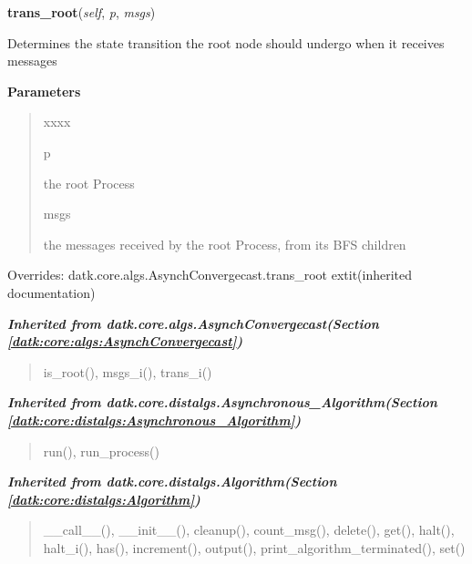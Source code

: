 \hspace{.8\funcindent}\begin{boxedminipage}{\funcwidth}

    \raggedright \textbf{trans\_root}(\textit{self}, \textit{p}, \textit{msgs})

\setlength{\parskip}{2ex}
    Determines the state transition the root node should undergo when it 
    receives messages

\setlength{\parskip}{1ex}
      \textbf{Parameters}
      \vspace{-1ex}

      \begin{quote}
        \begin{Ventry}{xxxx}

          \item[p]

          the root Process

          \item[msgs]

          the messages received by the root Process, from its BFS children

        \end{Ventry}

      \end{quote}

      Overrides: datk.core.algs.AsynchConvergecast.trans\_root 	extit{(inherited documentation)}

    \end{boxedminipage}


\large{\textbf{\textit{Inherited from datk.core.algs.AsynchConvergecast\textit{(Section \ref{datk:core:algs:AsynchConvergecast})}}}}

\begin{quote}
is\_root(), msgs\_i(), trans\_i()
\end{quote}

\large{\textbf{\textit{Inherited from datk.core.distalgs.Asynchronous\_Algorithm\textit{(Section \ref{datk:core:distalgs:Asynchronous_Algorithm})}}}}

\begin{quote}
run(), run\_process()
\end{quote}

\large{\textbf{\textit{Inherited from datk.core.distalgs.Algorithm\textit{(Section \ref{datk:core:distalgs:Algorithm})}}}}

\begin{quote}
\_\_call\_\_(), \_\_init\_\_(), cleanup(), count\_msg(), delete(), get(), halt(), halt\_i(), has(), increment(), output(), print\_algorithm\_terminated(), set()
\end{quote}

